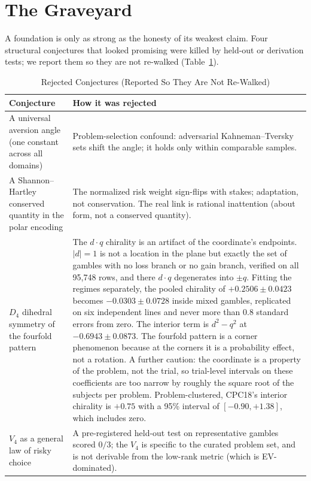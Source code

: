 \documentclass[journal]{IEEEtran}
\begin{document}
\section{The Graveyard}
\label{sec:graveyard}

A foundation is only as strong as the honesty of its weakest claim.
Four structural conjectures that looked promising were killed by held-out or derivation tests; we report them so they are not re-walked (Table~\ref{tab:graveyard}).

\begin{table}[!t]
\renewcommand{\arraystretch}{1.2}
\caption{Rejected Conjectures (Reported So They Are Not Re-Walked)}
\label{tab:graveyard}
\centering
\begin{tabular}{@{}p{} p{}@{}}
\toprule
\textbf{Conjecture} & \textbf{How it was rejected} \\
\midrule
A universal aversion angle (one constant across all domains) & Problem-selection confound: adversarial Kahneman--Tversky sets shift the angle; it holds only within comparable samples. \\
A Shannon--Hartley conserved quantity in the polar encoding & The normalized risk weight sign-flips with stakes; adaptation, not conservation. The real link is rational inattention (about form, not a conserved quantity). \\
$D_4$ dihedral symmetry of the fourfold pattern & The $d\!\cdot\!q$ chirality is an artifact of the coordinate's endpoints. $|d|=1$ is not a location in the plane but exactly the set of gambles with no loss branch or no gain branch, verified on all 95{,}748 rows, and there $d\!\cdot\!q$ degenerates into $\pm q$. Fitting the regimes separately, the pooled chirality of $+0.2506\pm0.0423$ becomes $-0.0303\pm0.0728$ inside mixed gambles, replicated on six independent lines and never more than 0.8 standard errors from zero. The interior term is $d^2-q^2$ at $-0.6943\pm0.0873$. The fourfold pattern is a corner phenomenon because at the corners it is a probability effect, not a rotation. A further caution: the coordinate is a property of the problem, not the trial, so trial-level intervals on these coefficients are too narrow by roughly the square root of the subjects per problem. Problem-clustered, CPC18's interior chirality is $+0.75$ with a 95\% interval of $[-0.90, +1.38]$, which includes zero. \\
$V_4$ as a general law of risky choice & A pre-registered held-out test on representative gambles scored $0/3$; the $V_4$ is specific to the curated problem set, and is not derivable from the low-rank metric (which is EV-dominated). \\
\bottomrule
\end{tabular}
\end{table}
\end{document}
